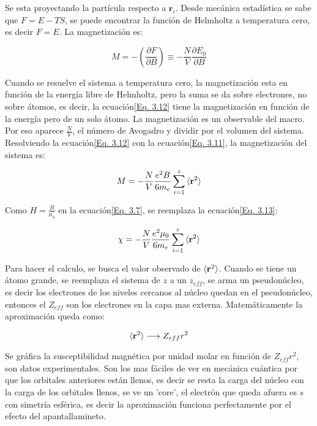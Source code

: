 \documentclass[11pt,fleqn]{book}
\renewcommand{\vec}[1]{\mathbf{#1}}
\begin{document}
Se esta proyectando la partícula respecto a $\vec{r}_{i}$. Desde mecánica estadística se sabe que $F=E-TS$, se puede encontrar la función de Helmholtz a temperatura cero, es decir $F=E$. La magnetización es:

\begin{equation}
    M=-\left(\frac{\partial F}{\partial B}\right)\equiv-\frac{N}{V}\frac{\partial E_{0}}{\partial B}
    \label{Eq. 3.12}
\end{equation}

Cuando se resuelve el sistema a temperatura cero, la magnetización esta en función de la energía libre de Helmholtz, pero la suma se da sobre electrones, no sobre átomos, es decir, la ecuación\ref{Eq. 3.12} tiene la magnetización en función de la energía pero de un solo átomo. La magnetización es un observable del macro. Por eso aparece $\frac{N}{V}$, el número de Avogadro y dividir por el volumen del sistema. Resolviendo la ecuación\ref{Eq. 3.12} con la ecuación\ref{Eq. 3.11}, la magnetización del sistema es:

\begin{equation}
     M=-\frac{N}{V}\frac{e^{2}B}{6m_{e}}\sum_{i=1}^{z}\braket{\vec{r}^{2}}
    \label{Eq. 3.13}
\end{equation}

Como $H=\frac{B}{\mu_{0}}$ en la ecuación\ref{Eq. 3.7}, se reemplaza la ecuación\ref{Eq. 3.13}:

\begin{equation}
      \chi=-\frac{N}{V}\frac{e^{2}\mu_{0}}{6m_{e}}\sum_{i=1}^{z}\braket{\vec{r}^{2}}
    \label{Eq. 3.14}
\end{equation}

Para hacer el calculo, se busca el valor observado de $\braket{\vec{r}^{2}}$. Cuando se tiene un átomo grande, se reemplaza el sistema de $z$ a un $z_{eff}$, se arma un pseudonúcleo, es decir los electrones de los niveles cercanos al núcleo quedan en el pseudonúcleo, entonces el $Z_{eff}$ son los electrones en la capa mas externa. Matemáticamente la aproximación queda como:

\begin{equation*}
    \braket{\vec{r}^{2}}\longrightarrow Z_{eff}r^{2}
\end{equation*}


Se gráfica la susceptibilidad magnética por unidad molar en función de $ Z_{eff}r^{2}$, son datos experimentales. Son los mas fáciles de ver en mecánica cuántica por que los orbitales anteriores están llenos, es decir se resta la carga del núcleo con la carga de los orbitales llenos, se ve un 'core', el electrón que queda afuera es $s$ con simetría esférica, es decir la aproximación funciona perfectamente por el efecto del apantallamineto.
\end{document}
